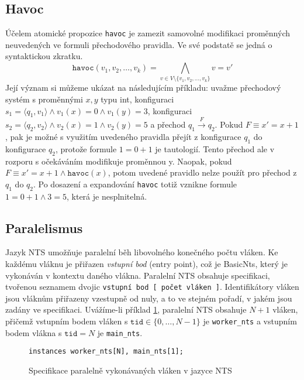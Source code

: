 \documentclass[12pt]{fithesis2}
\newcommand{\tuple}[1]{\langle #1 \rangle}
\begin{document}
\subsection{Havoc}
\label{subsec:nts-havoc}
Účelem atomické propozice \texttt{havoc} je zamezit samovolné modifikaci proměnných neuvedených ve formuli přechodového pravidla. Ve své podstatě se jedná o syntaktickou zkratku.
\begin{equation}
\texttt{havoc} \left( v_1, v_2, \ldots, v_k \right) = \bigwedge_{v \in V \setminus \{ v_1, v_2, \ldots, v_k \}} v = v'
\end{equation}
Její význam si můžeme ukázat na následujícím příkladu: uvažme přechodový systém s proměnnými $x,y$ typu int, konfiguraci $s_1 = \tuple{q_1, v_1} \land v_1(x) = 0 \land v_1(y) = 3$, konfiguraci $s_2 = \tuple{q_2, v_2} \land v_2(x) = 1 \land v_2(y) = 5$ a přechod $q_1 \overset{F}{\rightarrow} q_2$. Pokud $F \equiv x' = x + 1$, pak je možné s využitím uvedeného pravidla přejít z konfigurace $q_1$ do konfigurace $q_2$, protože formule $1 = 0 + 1$ je tautologií. Tento přechod ale v rozporu s očekáváním modifikuje proměnnou y. Naopak, pokud $F \equiv x' = x + 1 \land \texttt{havoc}(x)$, potom uvedené pravidlo nelze použít pro přechod z $q_1$ do $q_2$. Po dosazení a expandování \texttt{havoc} totiž vznikne formule $1 = 0 + 1 \land 3 = 5$, která je nesplnitelná.

\subsection{Paralelismus}
\label{subsec:nts-paralelism}
Jazyk NTS umožňuje paralelní běh libovolného konečného počtu vláken. Ke každému vláknu je přiřazen \textit{vstupní bod} (entry point), což je BasicNts, který je vykonáván v kontextu daného vlákna. Paralelní NTS obsahuje specifikaci, tvořenou seznamem dvojic \texttt{vstupní bod [ počet vláken ]}. Identifikátory vláken jsou vláknům přiřazeny vzestupně od nuly, a to ve stejném pořadí, v jakém jsou zadány ve specifikaci.  Uvážíme-li příklad \ref{fig:nts-instances}, paralelní NTS obsahuje $N+1$ vláken, přičemž vstupním bodem vláken s $\texttt{tid} \in \{ 0, \ldots, N - 1 \}$ je \texttt{worker\_nts} a vstupním bodem vlákna s $\texttt{tid} = N$ je \texttt{main\_nts}.

\begin{figure}[h!]
\begin{lstlisting}
instances worker_nts[N], main_nts[1];
\end{lstlisting}
\caption{Specifikace paralelně vykonávaných vláken v jazyce NTS}
\label{fig:nts-instances}
\end{figure}
\end{document}
